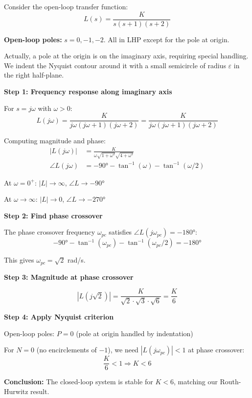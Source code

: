 \begin{example}
\label{ex:nyquist_type1}
Consider the open-loop transfer function:
\begin{equation}
L(s) = \frac{K}{s(s+1)(s+2)}
\end{equation}

\textbf{Open-loop poles:} $s = 0, -1, -2$. All in LHP except for the pole at origin.

Actually, a pole at the origin is on the imaginary axis, requiring special handling. We indent the Nyquist contour around it with a small semicircle of radius $\varepsilon$ in the right half-plane.

\textbf{Step 1: Frequency response along imaginary axis}

For $s = j\omega$ with $\omega > 0$:
\begin{equation}
L(j\omega) = \frac{K}{j\omega(j\omega+1)(j\omega+2)} = \frac{K}{j\omega(j\omega+1)(j\omega+2)}
\end{equation}

Computing magnitude and phase:
\begin{align}
|L(j\omega)| &= \frac{K}{\omega\sqrt{1+\omega^2}\sqrt{4+\omega^2}} \\
\angle L(j\omega) &= -90° - \tan^{-1}(\omega) - \tan^{-1}(\omega/2)
\end{align}

At $\omega = 0^+$: $|L| \to \infty$, $\angle L \to -90°$

At $\omega \to \infty$: $|L| \to 0$, $\angle L \to -270°$

\textbf{Step 2: Find phase crossover}

The phase crossover frequency $\omega_{pc}$ satisfies $\angle L(j\omega_{pc}) = -180°$:
\begin{equation}
-90° - \tan^{-1}(\omega_{pc}) - \tan^{-1}(\omega_{pc}/2) = -180°
\end{equation}

This gives $\omega_{pc} = \sqrt{2}$ rad/s.

\textbf{Step 3: Magnitude at phase crossover}

\begin{equation}
|L(j\sqrt{2})| = \frac{K}{\sqrt{2} \cdot \sqrt{3} \cdot \sqrt{6}} = \frac{K}{6}
\end{equation}

\textbf{Step 4: Apply Nyquist criterion}

Open-loop poles: $P = 0$ (pole at origin handled by indentation)

For $N = 0$ (no encirclements of $-1$), we need $|L(j\omega_{pc})| < 1$ at phase crossover:
\begin{equation}
\frac{K}{6} < 1 \Rightarrow K < 6
\end{equation}

\textbf{Conclusion:} The closed-loop system is stable for $K < 6$, matching our Routh-Hurwitz result.
\end{example}

